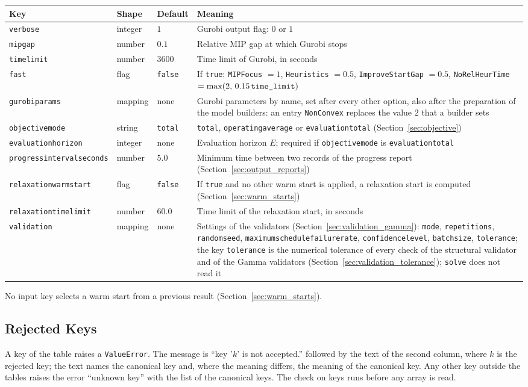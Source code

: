 \documentclass[11pt,a4paper]{article}
\makeatletter
\theoremstyle{plain}
\theoremstyle{definition}
\renewcommand{\_}{\textunderscore\allowbreak{}}
\providecommand{\optrow}[4]{{\raggedright #1\par} & {\raggedright #2\par} & {\raggedright #3\par} & {\raggedright #4\par} \\}
\providecommand{\tabstart}[2]{\begingroup\small\begin{longtable}{@{}#1@{}}\toprule #2 \\ \midrule \endhead}
\providecommand{\tabend}{\bottomrule\end{longtable}\endgroup}
\makeatother
\begin{document}
\tabstart{p{3.3cm}p{1.9cm}p{1.6cm}p{6.0cm}}{Key & Shape & Default & Meaning}
\optrow{\texttt{verbose}}{integer}{$1$}{Gurobi output flag: $0$ or $1$}
\optrow{\texttt{mip\_gap}}{number}{$0.1$}{Relative MIP gap at which Gurobi stops}
\optrow{\texttt{time\_limit}}{number}{$3600$}{Time limit of Gurobi, in seconds}
\optrow{\texttt{fast}}{flag}{\texttt{false}}{If \texttt{true}: \texttt{MIPFocus} $= 1$, \texttt{Heuristics} $= 0.5$, \texttt{ImproveStartGap} $= 0.5$, \texttt{NoRelHeurTime} $= \max(2,\, 0.15\,\texttt{time\_limit})$}
\optrow{\texttt{gurobi\_params}}{mapping}{none}{Gurobi parameters by name, set after every other option, also after the preparation of the model builders: an entry \texttt{NonConvex} replaces the value $2$ that a builder sets}
\optrow{\texttt{objective\_mode}}{string}{\texttt{total}}{\texttt{total}, \texttt{operating\_average} or \texttt{evaluation\_total} (Section~\ref{sec:objective})}
\optrow{\texttt{evaluation\_horizon}}{integer}{none}{Evaluation horizon $E$; required if \texttt{objective\_mode} is \texttt{evaluation\_total}}
\optrow{\texttt{progress\_interval\_seconds}}{number}{$5.0$}{Minimum time between two records of the progress report (Section~\ref{sec:output_reports})}
\optrow{\texttt{relaxation\_warm\_start}}{flag}{\texttt{false}}{If \texttt{true} and no other warm start is applied, a relaxation start is computed (Section~\ref{sec:warm_starts})}
\optrow{\texttt{relaxation\_time\_limit}}{number}{$60.0$}{Time limit of the relaxation start, in seconds}
\optrow{\texttt{validation}}{mapping}{none}{Settings of the validators (Section~\ref{sec:validation_gamma}): \texttt{mode}, \texttt{repetitions}, \texttt{random\_seed}, \texttt{maximum\_schedule\_failure\_rate}, \texttt{confidence\_level}, \texttt{batch\_size}, \texttt{tolerance}; the key \texttt{tolerance} is the numerical tolerance of every check of the structural validator and of the Gamma validators (Section~\ref{sec:validation_tolerance}); \texttt{solve} does not read it}
\tabend

No input key selects a warm start from a previous result (Section~\ref{sec:warm_starts}).

\subsection{Rejected Keys}\label{sec:input_rejected}

A key of the table raises a \texttt{ValueError}.
The message is ``key '$k$' is not accepted.'' followed by the text of the second column, where $k$ is the rejected key; the text names the canonical key and, where the meaning differs, the meaning of the canonical key.
Any other key outside the tables raises the error ``unknown key'' with the list of the canonical keys.
The check on keys runs before any array is read.
\end{document}
